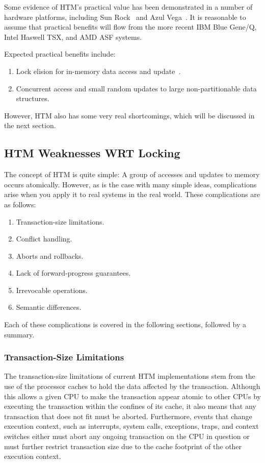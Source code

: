 Some evidence of HTM's practical value has been demonstrated in a number
of hardware platforms, including
Sun Rock~\cite{DaveDice2009ASPLOSRockHTM} and
Azul Vega~\cite{CliffClick2009AzulHTM}.
It is reasonable to assume that practical benefits will flow from the
more recent IBM Blue Gene/Q, Intel Haswell TSX, and AMD ASF systems.

Expected practical benefits include:

\begin{enumerate}
\item	Lock elision for in-memory data access and
	update~\cite{Martinez01a,Rajwar02a}.
\item	Concurrent access and small random updates to large non-partitionable
	data structures.
\end{enumerate}

However, HTM also has some very real shortcomings, which will be discussed
in the next section.

\subsection{HTM Weaknesses WRT Locking}
\label{sec:future:HTM Weaknesses WRT Locking}

The concept of HTM is quite simple: A group of accesses and updates to
memory occurs atomically.
However, as is the case with many simple ideas, complications arise
when you apply it to real systems in the real world.
These complications are as follows:

\begin{enumerate}
\item	Transaction-size limitations.
\item	Conflict handling.
\item	Aborts and rollbacks.
\item	Lack of forward-progress guarantees.
\item	Irrevocable operations.
\item	Semantic differences.
\end{enumerate}

Each of these complications is covered in the following sections,
followed by a summary.

\subsubsection{Transaction-Size Limitations}
\label{sec:future:Transaction-Size Limitations}

The transaction-size limitations of current HTM implementations
stem from the use of the processor caches to hold the data
affected by the transaction.
Although this allows a given CPU to make the transaction appear atomic to
other CPUs by executing the transaction within the confines of its cache,
it also means that any transaction that does not fit must be aborted.
Furthermore, events that change execution context, such as interrupts,
system calls, exceptions, traps, and context switches either must
abort any ongoing transaction on the CPU in question or must further
restrict transaction size due to the cache footprint of the other
execution context.

